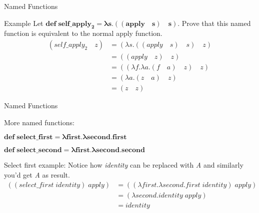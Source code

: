 \documentclass{beamer}
\begin{document}
\begin{frame}{Named Functions}
\begin{block}{Example}
Let $\mathbf{def \; self\_apply_2 = \lambda s . ((apply \quad s) \quad s)}$. Prove that this named function is equivalent to the normal apply function.
	\begin{align*}
		(self\_apply_2 \quad z) &= (\lambda s . ((apply \quad s) \quad s) \quad z) \\
        &= ((apply \quad z) \quad z) \\
        &= ((\lambda f . \lambda a . (f \quad a) \quad z) \quad z) \\
        &= (\lambda a . (z \quad a) \quad z) \\
        &= (z \quad z)
    \end{align*}
\end{block}
\end{frame}

\begin{frame}{Named Functions}
\begin{block}{More named functions:}
	\begin{framed} $\mathbf{def \; select\_first = \lambda first . \lambda second . first}$ \end{framed}
    \begin{framed} $\mathbf{def \; select\_second = \lambda first . \lambda second . second}$ \end{framed}
\end{block}
\begin{block}{Select first example:}
Notice how \textit{identity} can be replaced with \textit{A} and similarly you'd get \textit{A} as result.
	\begin{align*}
    	((select\_first \; identity) \; apply) &= ((\lambda first . \lambda second . first \; identity) \; apply) \\
        &= (\lambda second. identity \; apply) \\
        &= identity
    \end{align*}
\end{block}
\end{frame}
\end{document}
